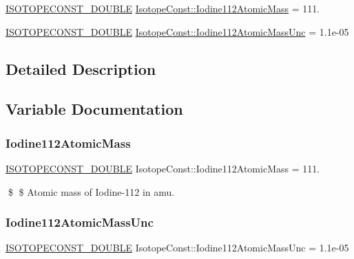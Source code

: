 \begin{DoxyCompactItemize}
\item 
\mbox{\hyperlink{group___isotope_const-_macros_ga8f45a7272ce02c0b4c65c44636ed719a}{I\+S\+O\+T\+O\+P\+E\+C\+O\+N\+S\+T\+\_\+\+D\+O\+U\+B\+LE}} \mbox{\hyperlink{group___isotope_const-_iodine-_i112_ga9087e0c07f3bb8968d129a3665fcbe30}{Isotope\+Const\+::\+Iodine112\+Atomic\+Mass}} = 111.
\item 
\mbox{\hyperlink{group___isotope_const-_macros_ga8f45a7272ce02c0b4c65c44636ed719a}{I\+S\+O\+T\+O\+P\+E\+C\+O\+N\+S\+T\+\_\+\+D\+O\+U\+B\+LE}} \mbox{\hyperlink{group___isotope_const-_iodine-_i112_gaeac1d62ce1cfa39f6f580d18b01842e3}{Isotope\+Const\+::\+Iodine112\+Atomic\+Mass\+Unc}} = 1.\+1e-\/05
\end{DoxyCompactItemize}


\subsection{Detailed Description}


\subsection{Variable Documentation}
\mbox{\label{group___isotope_const-_iodine-_i112_ga9087e0c07f3bb8968d129a3665fcbe30}} 
\subsubsection{\texorpdfstring{Iodine112\+Atomic\+Mass}{Iodine112AtomicMass}}
{\footnotesize\ttfamily \mbox{\hyperlink{group___isotope_const-_macros_ga8f45a7272ce02c0b4c65c44636ed719a}{I\+S\+O\+T\+O\+P\+E\+C\+O\+N\+S\+T\+\_\+\+D\+O\+U\+B\+LE}} Isotope\+Const\+::\+Iodine112\+Atomic\+Mass = 111.}

\$ \$ Atomic mass of Iodine-\/112 in amu. \mbox{\label{group___isotope_const-_iodine-_i112_gaeac1d62ce1cfa39f6f580d18b01842e3}} 
\subsubsection{\texorpdfstring{Iodine112\+Atomic\+Mass\+Unc}{Iodine112AtomicMassUnc}}
{\footnotesize\ttfamily \mbox{\hyperlink{group___isotope_const-_macros_ga8f45a7272ce02c0b4c65c44636ed719a}{I\+S\+O\+T\+O\+P\+E\+C\+O\+N\+S\+T\+\_\+\+D\+O\+U\+B\+LE}} Isotope\+Const\+::\+Iodine112\+Atomic\+Mass\+Unc = 1.\+1e-\/05}

